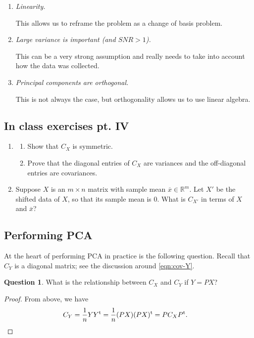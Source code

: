 \documentclass[a4paper, 12pt]{article}
\numberwithin{equation}{section}
\numberwithin{figure}{section}
\theoremstyle{definition}
\newtheorem{quest}[thm]{Question}
\newcommand{\R}{\mathbb{R}}
\newcommand{\tr}{\mathrm{t}}
\begin{document}
\begin{enumerate}
	\item \textit{Linearity.} 
	
	This allows us to reframe the problem as a change of basis problem. 

	\item \textit{Large variance is important (and $SNR>1$).}
	
	This can be a very strong assumption and really needs to take into account
	how the data was collected. 
	
	\item \textit{Principal components are orthogonal.}
	
	This is not always the case, but orthogonality allows us to use linear
	algebra. 
\end{enumerate}

\subsection{In class exercises pt. IV}

\begin{enumerate}
	\item 
	\begin{enumerate}
		\item Show that $C_X$ is symmetric. 
		\item Prove that the diagonal entries of $C_X$ are variances and the
		off-diagonal entries are covariances. 
	\end{enumerate}
	\item Suppose $X$ is an $m\times n$ matrix with sample mean
	$\overline{x}\in\R^m$. Let $X'$ be the shifted data of $X$, so that its
	sample mean is $0$. What is $C_{X'}$ in terms of $X$ and $\overline{x}$?
\end{enumerate}

\subsection{Performing PCA}\label{sec:perform-pca}

At the heart of performing PCA in practice is the following question. Recall
that $C_Y$ is a diagonal matrix; see the discussion around \eqref{eqn:cov-Y}.

\begin{quest} 
	What is the relationship between $C_X$ and $C_Y$ if $Y = PX$? 
\end{quest}

\begin{proof}
	From above, we have
	\begin{align*}
		C_Y &= \dfrac{1}{n} YY^{\tr} = \dfrac{1}{n} (PX)(PX)^{\tr} = P C_X P^{\tr}. \qedhere
	\end{align*}
\end{proof}
\end{document}
